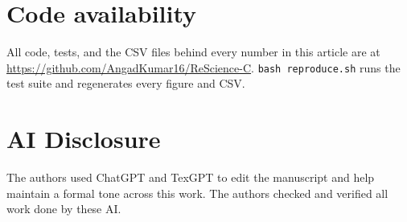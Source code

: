 \documentclass[a4paper, oneside, 10pt]{article}
\begin{document}
\section*{Code availability}

All code, tests, and the CSV files behind every number in this article are at \url{https://github.com/AngadKumar16/ReScience-C}. \texttt{bash reproduce.sh} runs the test suite and regenerates every figure and CSV.

\section*{AI Disclosure}

The authors used ChatGPT and TexGPT to edit the manuscript and help maintain a formal tone across this work. The authors checked and verified all work done by these AI. 

\hypersetup{linkcolor=black,urlcolor=darkgray}
\renewcommand\emph[1]{{\bfseries #1}}
\setlength\bibitemsep{0pt}
\printbibliography
\end{document}
